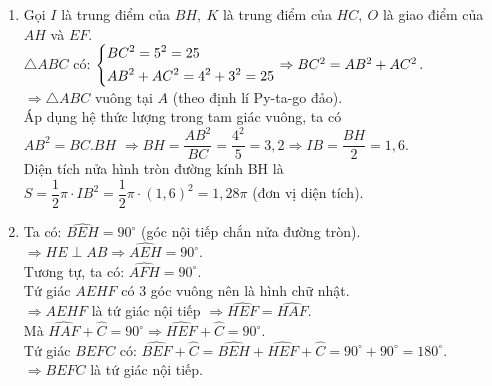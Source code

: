 \begin{ex}
{\begin{center}
	 	\end{center} 
	 \begin{enumerate}
	  	\item  Gọi $I$ là trung điểm của $BH,\ K$ là trung điểm của $HC,\ O$ là giao điểm của $AH$ và $EF.$\\
	    $\triangle ABC$ có: $\left\{\begin{aligned}&BC^2 = 5^2 = 25\\
	    &AB^2+AC^2 = 4^2+3^2 = 25\end{aligned}\right.
	    \Rightarrow  BC^2 = AB^2+AC^2$. \\
	    $\Rightarrow \triangle ABC$ vuông tại $A$ (theo định lí Py-ta-go đảo).\\
	    Áp dụng hệ thức lượng trong tam giác vuông, ta có\\
	    $AB^2 = BC.BH$ $\Rightarrow BH=\dfrac{AB^2}{BC}=\dfrac{4^2}{5}=3{,}2\Rightarrow IB=\dfrac{BH}{2}=1{,}6$.\\
	    Diện tích nửa hình tròn đường kính BH là\\
	    $S=\dfrac{1}{2}\pi\cdot IB^2=\dfrac{1}{2}\pi\cdot(1,6)^2=1{,}28\pi $ (đơn vị diện tích).
	    \item  Ta có: $\widehat{BEH}=90^\circ$ (góc nội tiếp chắn nửa đường tròn).\\ 
		$\Rightarrow HE\perp AB\Rightarrow \widehat{AEH}=90^\circ$.\\
		Tương tự, ta có: $\widehat{AFH}=90^\circ$.\\
		Tứ giác $AEHF$ có $3$ góc vuông nên là hình chữ nhật.\\
		$\Rightarrow AEHF$ là tứ giác nội tiếp $\Rightarrow \widehat{HEF}=\widehat{HAF}$.\\
		Mà $\widehat{HAF}+\widehat{C}={90}^\circ \Rightarrow \widehat{HEF}+\widehat{C}={90}^\circ$.\\
		Tứ giác $BEFC$ có: $\widehat{BEF}+\widehat{C}=\widehat{BEH}+\widehat{HEF}+\widehat{C}=90^\circ+90^\circ=180^\circ$.\\
		$\Rightarrow BEFC$ là tứ giác nội tiếp.\\

\end{enumerate}}
\end{ex}
